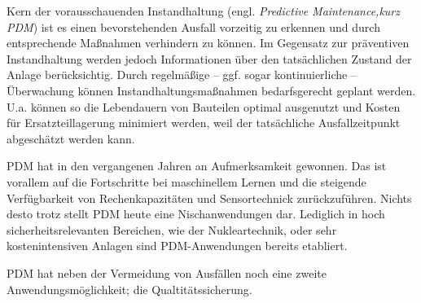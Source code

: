 Kern der vorausschauenden Instandhaltung (engl. \textit{Predictive Maintenance,kurz PDM}) ist es einen bevorstehenden Ausfall vorzeitig zu erkennen und durch entsprechende Maßnahmen verhindern zu können. Im Gegensatz zur präventiven Instandhaltung werden jedoch Informationen über den tatsächlichen Zustand der Anlage berücksichtig. Durch regelmäßige -- ggf. sogar kontinuierliche -- Überwachung können Instandhaltungsmaßnahmen bedarfsgerecht geplant werden. U.a. können so die Lebendauern von Bauteilen optimal ausgenutzt und Kosten für Ersatzteillagerung minimiert werden, weil der tatsächliche Ausfallzeitpunkt abgeschätzt werden kann.

PDM hat in den vergangenen Jahren an Aufmerksamkeit gewonnen. Das ist vorallem auf die Fortschritte bei maschinellem Lernen und die steigende Verfügbarkeit von Rechenkapazitäten und Sensortechnick zurückzuführen. Nichts desto trotz stellt PDM heute eine Nischanwendungen dar. Lediglich in hoch sicherheitsrelevanten Bereichen, wie der Nukleartechnik, oder sehr kostenintensiven Anlagen sind PDM-Anwendungen bereits etabliert. 

PDM hat neben der Vermeidung von Ausfällen noch eine zweite Anwendungsmöglichkeit; die Qualtitätssicherung.